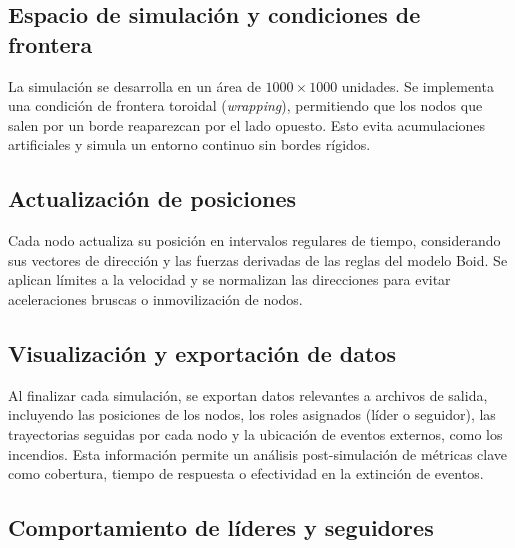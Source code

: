 \documentclass{article}
\begin{document}
\subsection{Espacio de simulación y condiciones de frontera}

La simulación se desarrolla en un área de $1000 \times 1000$ unidades. Se implementa una condición de frontera toroidal (\textit{wrapping}), permitiendo que los nodos que salen por un borde reaparezcan por el lado opuesto. Esto evita acumulaciones artificiales y simula un entorno continuo sin bordes rígidos.

\subsection{Actualización de posiciones}

Cada nodo actualiza su posición en intervalos regulares de tiempo, considerando sus vectores de dirección y las fuerzas derivadas de las reglas del modelo Boid. Se aplican límites a la velocidad y se normalizan las direcciones para evitar aceleraciones bruscas o inmovilización de nodos.

\subsection{Visualización y exportación de datos}

Al finalizar cada simulación, se exportan datos relevantes a archivos de salida, incluyendo las posiciones de los nodos, los roles asignados (líder o seguidor), las trayectorias seguidas por cada nodo y la ubicación de eventos externos, como los incendios.
Esta información permite un análisis post-simulación de métricas clave como cobertura, tiempo de respuesta o efectividad en la extinción de eventos.

\subsection{Comportamiento de líderes y seguidores}
\end{document}
